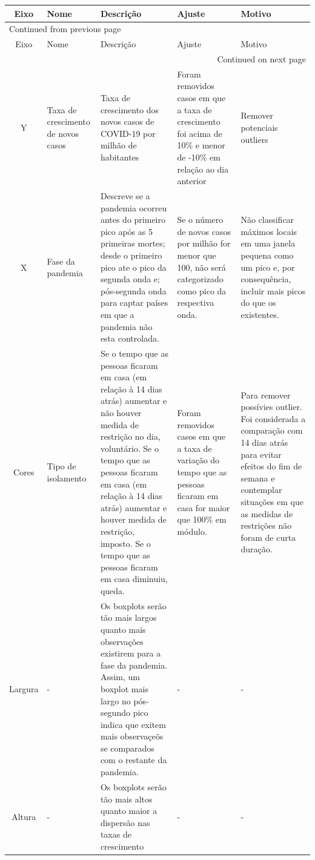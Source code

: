 \documentclass{SelfArx}
\begin{document}
\begin{longtable}{c|p{2cm}|p{5cm}|p{5cm}|p{3cm}}
\hline
Eixo & Nome & Descrição & Ajuste & Motivo\\
\hline
\endfirsthead
\multicolumn{5}{l}{Continued from previous page} \\
\hline

Eixo & Nome & Descrição & Ajuste & Motivo \\

\hline
\endhead
\hline\multicolumn{5}{r}{Continued on next page} \\
\endfoot
\endlastfoot
\hline
Y & Taxa de crescimento de novos casos & Taxa de crescimento dos novos casos de COVID-19 por milhão de habitantes & Foram removidos casos em que a taxa de crescimento foi acima de 10\% e menor de -10\% em relação ao dia anterior & Remover potenciais outliers\\
\hline
X & Fase da pandemia & Descreve se a pandemia ocorreu antes do primeiro pico após as 5 primeiras mortes; desde o primeiro pico ate o pico da segunda onda e; pós-segunda onda para captar países em que a pandemia não esta controlada. & Se o número de novos casos por milhão for menor que 100, não será categorizado como pico da respectiva onda. & Não classificar máximos locais em uma janela pequena como um pico e, por consequência, incluir mais picos do que os existentes.\\
\hline
Cores & Tipo de isolamento & Se o tempo que as pessoas ficaram em casa (em relação à 14 dias atrás) aumentar e não houver medida de restrição no dia, voluntário. Se o tempo que as pessoas ficaram em casa (em relação à 14 dias atrás) aumentar e houver medida de restrição, imposto. Se o tempo que as pessoas ficaram em casa diminuiu, queda. & Foram removidos casos em que a taxa de variação do tempo que as pessoas ficaram em casa for maior que 100\% em módulo. & Para remover possívies outlier. Foi considerada a comparação com 14 dias atrás para evitar efeitos do fim de semana e contemplar situações em que as medidas de restrições não foram de curta duração.\\
\hline
Largura & - & Os boxplots serão tão mais largos quanto mais observações existirem para a fase da pandemia. Assim, um boxplot mais largo no pós-segundo pico indica que exitem mais observaçeõs se comparados com o restante da pandemia. & - & -\\
\hline
Altura & - & Os boxplots serão tão mais altos quanto maior a dispersão nas taxas de crescimento & - & -\\
\hline
\end{longtable}
\end{document}

